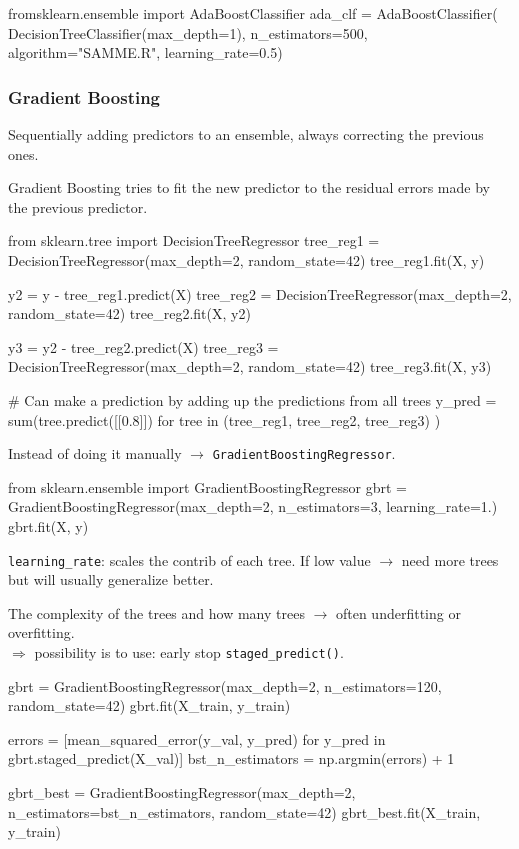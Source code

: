 \begin{python}
    fromsklearn.ensemble import AdaBoostClassifier
    ada_clf = AdaBoostClassifier(
            DecisionTreeClassifier(max_depth=1), n_estimators=500,
            algorithm="SAMME.R", learning_rate=0.5)
\end{python}


\subsubsection{Gradient Boosting}
Sequentially adding predictors to an ensemble, always correcting the previous ones.

Gradient Boosting tries to fit the new predictor to the residual errors made by the previous predictor.

\begin{python}
    from sklearn.tree import DecisionTreeRegressor
    tree_reg1 = DecisionTreeRegressor(max_depth=2, random_state=42)
    tree_reg1.fit(X, y)

    y2 = y - tree_reg1.predict(X)
    tree_reg2 = DecisionTreeRegressor(max_depth=2, random_state=42)
    tree_reg2.fit(X, y2)

    y3 = y2 - tree_reg2.predict(X)
    tree_reg3 = DecisionTreeRegressor(max_depth=2, random_state=42)
    tree_reg3.fit(X, y3)

    # Can make a prediction by adding up the predictions from all trees
    y_pred = sum(tree.predict([[0.8]]) for tree in (tree_reg1,
                                            tree_reg2, tree_reg3) )
\end{python}

Instead of doing it manually $\rightarrow$ \verb;GradientBoostingRegressor;.
\begin{python}
    from sklearn.ensemble import GradientBoostingRegressor
    gbrt = GradientBoostingRegressor(max_depth=2,
                        n_estimators=3, learning_rate=1.)
    gbrt.fit(X, y)
\end{python}
\verb;learning_rate;: scales the contrib of each tree. If low value $\rightarrow$ need more trees but will usually generalize better.

The complexity of the trees and how many trees $\rightarrow$ often underfitting or overfitting.\\
$\Rightarrow$ possibility is to use: early stop \verb;staged_predict();.

\begin{python}
    gbrt = GradientBoostingRegressor(max_depth=2, n_estimators=120,
                random_state=42)
    gbrt.fit(X_train, y_train)

    errors = [mean_squared_error(y_val, y_pred)
                for y_pred in gbrt.staged_predict(X_val)]
    bst_n_estimators = np.argmin(errors) + 1

    gbrt_best = GradientBoostingRegressor(max_depth=2,
            n_estimators=bst_n_estimators, random_state=42)
    gbrt_best.fit(X_train, y_train)
\end{python}

